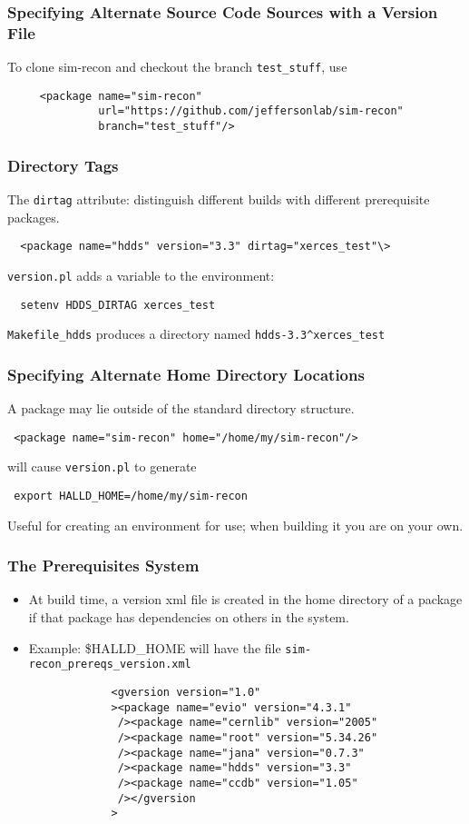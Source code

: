 \documentclass{beamer}
\newcommand{\bi}{\begin{itemize}}
\newcommand{\ei}{\end{itemize}}
\newcommand{\I}{\item}
\begin{document}
\begin{frame}[fragile]
  \frametitle{Specifying Alternate Source Code Sources with a Version File}
To clone sim-recon and checkout the branch {\tt test\_stuff}, use
\begin{verbatim}
     <package name="sim-recon"
              url="https://github.com/jeffersonlab/sim-recon"
              branch="test_stuff"/>
\end{verbatim}

\end{frame}
\begin{frame}[fragile]
  \frametitle{Directory Tags}

The {\tt dirtag} attribute: distinguish different builds with different prerequisite packages.
\begin{verbatim}
  <package name="hdds" version="3.3" dirtag="xerces_test"\>
\end{verbatim}
{\tt version.pl} adds a variable to the environment:
\begin{verbatim}
  setenv HDDS_DIRTAG xerces_test
\end{verbatim}
{\tt Makefile\_hdds} produces a directory named {\tt hdds-3.3\^{}xerces\_test}

\end{frame}
\begin{frame}
  \frametitle{Specifying Alternate Home Directory Locations}

A package may lie outside of the standard directory structure.
\begin{center} \tt
<package name="sim-recon" home="/home/my/sim-recon"/>
\end{center}
will cause {\tt version.pl} to generate
\begin{center} \tt
export HALLD\_HOME=/home/my/sim-recon
\end{center}
Useful for creating an environment for use; when building it you are on your own.

\end{frame}

\begin{frame}[fragile]
  \frametitle{The Prerequisites System}
\bi
\I At build time, a version xml file is created in the home directory of
a package if that package has dependencies on others in the
system.
\I Example: \$HALLD\_HOME will have the file {\tt sim-recon\_prereqs\_version.xml}
\ei
\begin{verbatim}
                <gversion version="1.0"
                ><package name="evio" version="4.3.1"
                 /><package name="cernlib" version="2005"
                 /><package name="root" version="5.34.26"
                 /><package name="jana" version="0.7.3"
                 /><package name="hdds" version="3.3"
                 /><package name="ccdb" version="1.05"
                 /></gversion
                >
\end{verbatim}
\end{frame}
\end{document}
